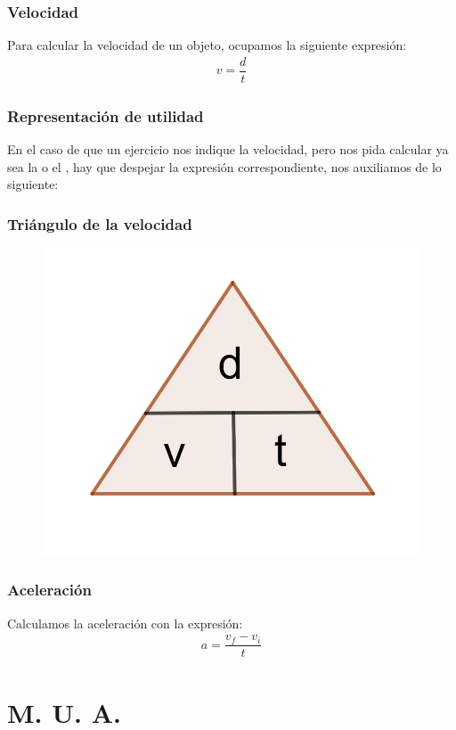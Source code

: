 \documentclass[14pt]{beamer}
\begin{document}
\begin{frame}
\frametitle{Velocidad}
Para calcular la velocidad de un objeto, ocupamos la siguiente expresión:
\pause
\begin{align*}
v = \dfrac{d}{t}
\end{align*}
\end{frame}
\begin{frame}
\frametitle{Representación de utilidad}
En el caso de que un ejercicio nos indique la velocidad, \pause pero nos pida calcular ya sea la  o el , hay que despejar la expresión correspondiente, \pause nos auxiliamos de lo siguiente:
\end{frame}
\begin{frame}
\frametitle{Triángulo de la velocidad}
\begin{figure}
    \includegraphics[scale=1]{Imagenes/triangulo_velocidad.png}
\end{figure}
\end{frame}
\begin{frame}
\frametitle{Aceleración}
Calculamos la aceleración con la expresión:
\pause
\begin{align*}
a = \dfrac{v_{f} - v_{i}}{t}
\end{align*}
\end{frame}

\section{M. U. A.}
\end{document}
